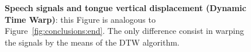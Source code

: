 \begin{figure}
  \centering
	

	\caption[Speech signals and tongue vertical displacement (Dynamic Time Warp)]
	{\textbf{Speech signals and tongue vertical displacement (Dynamic Time Warp)}:
	this Figure is analogous to Figure~\ref{fig:conclusions:end}. The only
	difference consist in warping the signals by the means of the DTW algorithm.}
	\label{fig:conclusions:end:dtw}
\end{figure}
